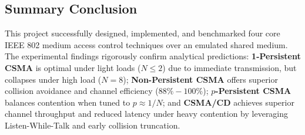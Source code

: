\documentclass[11pt,a4paper]{article}
\begin{document}
\subsection{Summary Conclusion}
This project successfully designed, implemented, and benchmarked four core IEEE 802 medium access control techniques over an emulated shared medium. The experimental findings rigorously confirm analytical predictions: \textbf{1-Persistent CSMA} is optimal under light loads ($N \le 2$) due to immediate transmission, but collapses under high load ($N=8$); \textbf{Non-Persistent CSMA} offers superior collision avoidance and channel efficiency ($88\%-100\%$); \textbf{$p$-Persistent CSMA} balances contention when tuned to $p \approx 1/N$; and \textbf{CSMA/CD} achieves superior channel throughput and reduced latency under heavy contention by leveraging Listen-While-Talk and early collision truncation.
\end{document}
